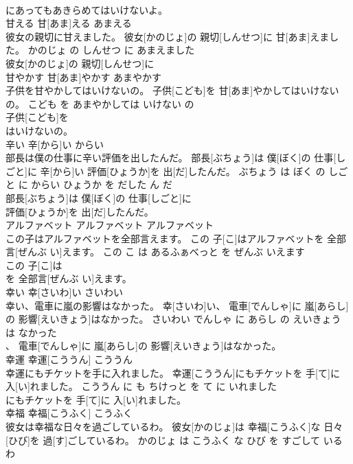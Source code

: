 \documentclass[8pt]{extreport}
\begin{document}
\begin{CJK}{UTF8}{min}
\\	にあってもあきらめてはいけないよ。			
\\	甘える	甘[あま]える	あまえる	
\\	彼女の親切に甘えました。	彼女[かのじょ]の 親切[しんせつ]に 甘[あま]えました。	かのじょ の しんせつ に あまえました	
\\	彼女[かのじょ]の 親切[しんせつ]に
\\	甘やかす	甘[あま]やかす	あまやかす	
\\	子供を甘やかしてはいけないの。	子供[こども]を 甘[あま]やかしてはいけないの。	こども を あまやかしては いけない の	
\\	子供[こども]を
\\	はいけないの。			
\\	辛い	辛[から]い	からい	
\\	部長は僕の仕事に辛い評価を出したんだ。	部長[ぶちょう]は 僕[ぼく]の 仕事[しごと]に 辛[から]い 評価[ひょうか]を 出[だ]したんだ。	ぶちょう は ぼく の しごと に からい ひょうか を だした ん だ	
\\	部長[ぶちょう]は 僕[ぼく]の 仕事[しごと]に
\\	評価[ひょうか]を 出[だ]したんだ。			
\\	アルファベット	アルファベット	アルファベット	
\\	この子はアルファベットを全部言えます。	この 子[こ]はアルファベットを 全部言[ぜんぶ い]えます。	この こ は あるふぁべっと を ぜんぶ いえます	
\\	この 子[こ]は
\\	を 全部言[ぜんぶ い]えます。			
\\	幸い	幸[さいわ]い	さいわい	
\\	幸い、電車に嵐の影響はなかった。	幸[さいわ]い、 電車[でんしゃ]に 嵐[あらし]の 影響[えいきょう]はなかった。	さいわい でんしゃ に あらし の えいきょう は なかった	
\\	、 電車[でんしゃ]に 嵐[あらし]の 影響[えいきょう]はなかった。			
\\	幸運	幸運[こううん]	こううん	
\\	幸運にもチケットを手に入れました。	幸運[こううん]にもチケットを 手[て]に 入[い]れました。	こううん に も ちけっと を て に いれました	
\\	にもチケットを 手[て]に 入[い]れました。			
\\	幸福	幸福[こうふく]	こうふく	
\\	彼女は幸福な日々を過ごしているわ。	彼女[かのじょ]は 幸福[こうふく]な 日々[ひび]を 過[す]ごしているわ。	かのじょ は こうふく な ひび を すごして いる わ	

\end{CJK}
\end{document}
